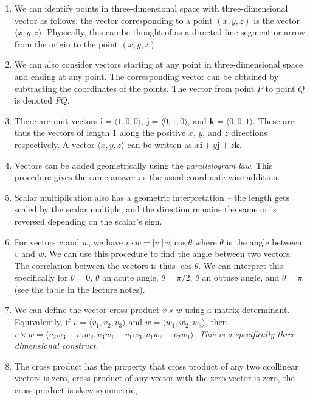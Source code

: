 \documentclass[10pt]{amsart}
\begin{document}
\begin{enumerate}
\item We can identify points in three-dimensional space with
  three-dimensional vector as follows: the vector corresponding to a
  point $(x,y,z)$ is the vector $\langle x,y,z \rangle$. Physically,
  this can be thought of as a directed line segment or arrow from the
  origin to the point $(x,y,z)$.
\item We can also consider vectors starting at any point in
  three-dimensional space and ending at any point. The corresponding
  vector can be obtained by subtracting the coordinates of the
  points. The vector from point $P$ to point $Q$ is denoted
  $\overline{PQ}$.
\item There are unit vectors $\mathbf{i} = \langle 1,0,0 \rangle$,
  $\mathbf{j} = \langle 0,1,0 \rangle$, and $\mathbf{k} = \langle
  0,0,1 \rangle$. These are thus the vectors of length $1$ along the
  positive $x$, $y$, and $z$ directions respectively. A vector
  $\langle x,y,z \rangle$ can be written as $x\mathbf{i} + y\mathbf{j}
  + z\mathbf{k}$.
\item Vectors can be added geometrically using the {\em parallelogram
  law}. This procedure gives the same answer as the usual
  coordinate-wise addition.
\item Scalar multiplication also has a geometric interpretation -- the
  length gets scaled by the scalar multiple, and the direction remains
  the same or is reversed depending on the scalar's sign.
\item For vectors $v$ and $w$, we have $v \cdot w = |v||w|\cos \theta$
  where $\theta$ is the angle between $v$ and $w$. We can use this
  procedure to find the angle between two vectors. The correlation
  between the vectors is thus $\cos \theta$. We can interpret this
  specifically for $\theta = 0$, $\theta$ an acute angle, $\theta =
  \pi/2$, $\theta$ an obtuse angle, and $\theta = \pi$ (see the table
  in the lecture notes).
\item We can define the vector cross product $v \times w$ using a
  matrix determinant. Equivalently, if $v = \langle v_1,v_2,v_3
  \rangle$ and $w = \langle w_1,w_2,w_3 \rangle$, then $v \times w =
  \langle v_2w_3 - v_3w_2, v_3w_1 - v_1w_3, v_1w_2 - v_2w_1
  \rangle$. {\em This is a specifically three-dimensional construct}.
\item The cross product has the property that cross product of any two
  qcollinear vectors is zero, cross product of any vector with the
  zero vector is zero, the cross product is skew-symmetric,

\end{enumerate}
\end{document}
